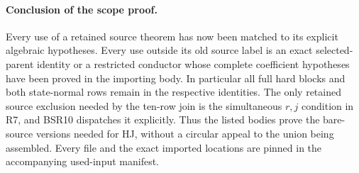 \paragraph{Conclusion of the scope proof.}
Every use of a retained source theorem has now been
matched to its explicit algebraic hypotheses.
Every use outside its old source label is an exact
selected-parent identity or a restricted conductor
whose complete coefficient hypotheses have been proved
in the importing body.
In particular all full hard blocks and both state-normal
rows remain in the respective identities.
The only retained source exclusion needed by the
ten-row join is the simultaneous \(r,j\) condition
in R7, and BSR10 dispatches it explicitly.
Thus the listed bodies prove the bare-source versions
needed for HJ, without a circular appeal to the
union being assembled.  Every file and the exact
imported locations are pinned in the accompanying
used-input manifest.
